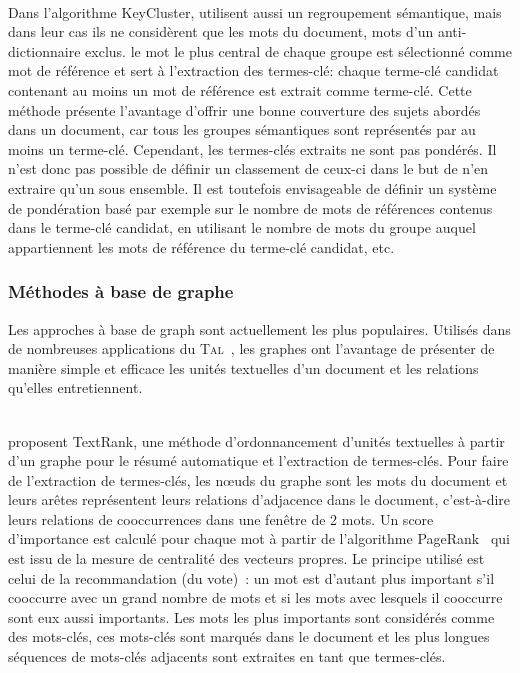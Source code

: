         ~\\Dans l'algorithme KeyCluster,  utilisent
        aussi un regroupement sémantique, mais dans leur cas ils ne considèrent
        que les mots du document, mots d'un anti-dictionnaire exclus. le mot le
        plus central de chaque groupe est sélectionné comme mot de référence et
        sert à l'extraction des termes-clé: chaque terme-clé candidat contenant
        au moins un mot de référence est extrait comme terme-clé. Cette méthode
        présente l'avantage d'offrir une bonne couverture des sujets abordés
        dans un document, car tous les groupes sémantiques sont représentés par
        au moins un terme-clé. Cependant, les termes-clés extraits ne sont pas
        pondérés. Il n'est donc pas possible de définir un classement de
        ceux-ci dans le but de n'en extraire qu'un sous ensemble. Il est
        toutefois envisageable de définir un système de pondération basé par
        exemple sur le nombre de mots de références contenus dans le terme-clé
        candidat, en  utilisant le nombre de mots du groupe auquel appartiennent
        les mots de référence du terme-clé candidat, etc.

      \subsubsection{Méthodes à base de graphe}
      \label{subsubsec:main-state_of_the_art-automatic_keyphrase_extraction-unsupervised_keyphrase_extraction-graph_based_approaches}
        Les approches à base de graph sont actuellement les plus populaires.
        Utilisés dans de nombreuses applications du
        \textsc{Tal}~\cite{kozareva2013textgraphs}, les graphes ont l'avantage
        de présenter de manière simple et efficace les unités textuelles d'un
        document et les relations qu'elles entretiennent.

        ~\\ proposent TextRank, une méthode
        d'ordonnancement d'unités textuelles à partir d'un graphe pour le résumé
        automatique et l'extraction de termes-clés. Pour faire de l'extraction
        de termes-clés, les n\oe{}uds du graphe sont les mots du document et
        leurs arêtes représentent leurs relations d'adjacence dans le document,
        c'est-à-dire leurs relations de cooccurrences dans une fenêtre de 2
        mots. Un score d'importance est calculé pour chaque mot à partir de
        l'algorithme PageRank~\cite{brin1998pagerank} qui est issu de la mesure
        de centralité des vecteurs propres. Le principe utilisé est celui de la
        recommandation (du vote)~: un mot est d'autant plus important s'il
        cooccurre avec un grand nombre de mots et si les mots avec lesquels il
        cooccurre sont eux aussi importants. Les mots les plus importants sont
        considérés comme des mots-clés, ces mots-clés sont marqués dans le
        document et les plus longues séquences de mots-clés adjacents sont
        extraites en tant que termes-clés.
      
